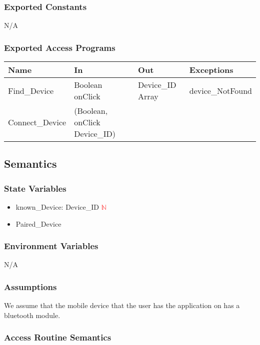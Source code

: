 \documentclass[12pt, titlepage]{article}
\begin{document}
\subsubsection{Exported Constants}
N/A

\subsubsection{Exported Access Programs}

\begin{center}
\begin{tabular}{p{4cm} p{4cm} p{4cm} p{4cm}}
\hline
\textbf{Name} & \textbf{In} & \textbf{Out} & \textbf{Exceptions} \\
\hline
Find\_Device & Boolean onClick & Device\_ID Array & device\_NotFound\\
Connect\_Device & (Boolean, onClick Device\_ID) &  & \\
\hline
\end{tabular}
\end{center}

\subsection{Semantics}

\subsubsection{State Variables}

\begin{itemize}
  \item known\_Device: Device\_ID \textcolor{red}{$\mathbb{N}$}
  \item Paired\_Device
\end{itemize}


\subsubsection{Environment Variables}

N/A

\subsubsection{Assumptions}

We assume that the mobile device that the user has the application on has a bluetooth module.

\subsubsection{Access Routine Semantics}
\end{document}
